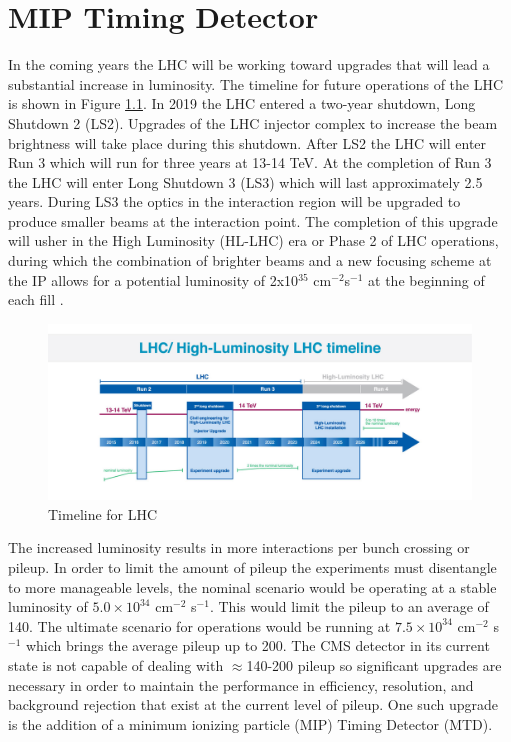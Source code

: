 \chapter{MIP Timing Detector}

In the coming years the LHC will be working toward upgrades that will lead a substantial increase in luminosity.  The timeline for future operations of the LHC is shown in Figure \ref{fig:lhctimeline}.  In 2019 the LHC entered a two-year shutdown, Long Shutdown 2 (LS2).  Upgrades of the LHC injector complex to increase the beam brightness will take place during this shutdown.  After LS2 the LHC will enter Run 3 which will run for three years at 13-14 TeV.  At the completion of Run 3 the LHC will enter Long Shutdown 3 (LS3) which will last approximately 2.5 years.  During LS3 the optics in the interaction region will be upgraded to produce smaller beams at the interaction point.  The completion of this upgrade will usher in the High Luminosity (HL-LHC) era or Phase 2 of LHC operations, during which the combination of brighter beams and a new focusing scheme at the IP allows for a potential luminosity of 2x10$^{35}$ cm$^{-2}$s$^{-1}$ at the beginning of each fill \cite{Apollinari:2017cqg}.  

\begin{figure}[h]
	\centering
	\includegraphics[width=1.0\linewidth]{Figures/LHCTimeline}
	\caption[Timeline for LHC]{Timeline for LHC \cite{DeMelis:2063307}}
	\label{fig:lhctimeline}
\end{figure}

The increased luminosity results in more interactions per bunch crossing or pileup.  In order to limit the amount of pileup the experiments must disentangle to more manageable levels, the nominal scenario would be operating at a stable luminosity of $5.0\times10^{34}$ cm$^{-2}$ s$^{-1}$.  This would limit the pileup to an average of 140.  The ultimate scenario for operations would be running at $7.5\times10^{34}$ cm$^{-2}$ s$^{-1}$ which brings the average pileup up to 200.  The CMS detector in its current state is not capable of dealing with $\approx$140-200 pileup so significant upgrades are necessary in order to maintain the performance in efficiency, resolution, and background rejection that exist at the current level of pileup.  One such upgrade is the addition of a minimum ionizing particle (MIP) Timing Detector (MTD).


